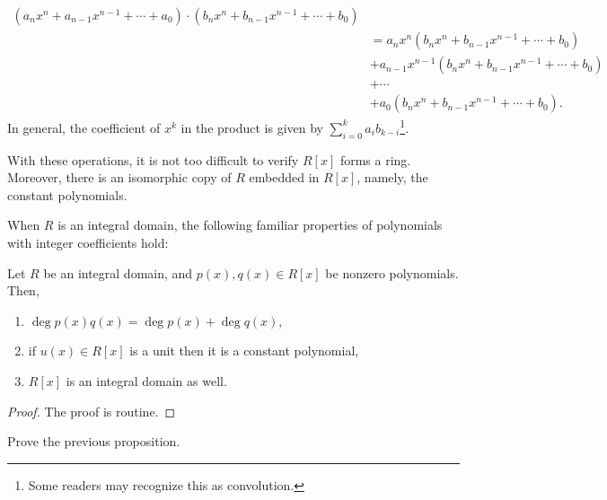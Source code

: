 \documentclass[./main.tex]{subfiles}
\begin{document}
\begin{align*}
    (a_n x^n + a_{n-1} x^{n-1} + \cdots + a_0) \cdot (b_n x^n + b_{n-1} x^{n-1} + \cdots + b_0) \\
    &= a_n x^n (b_n x^n + b_{n-1} x^{n-1} + \cdots + b_0) \\
    &+ a_{n-1} x^{n-1} (b_n x^n + b_{n-1} x^{n-1} + \cdots + b_0) \\
    &+ \cdots \\
    &+ a_0 (b_n x^n + b_{n-1} x^{n-1} + \cdots + b_0).
\end{align*}
In general, the coefficient of $x^k$ in the product is given by $\sum_{i=0}^k
a_i b_{k-i}$\footnote{Some readers may recognize this as convolution.}. 

With these operations, it is not too difficult to verify $R[x]$ forms a ring.
Moreover, there is an isomorphic copy of $R$ embedded in $R[x]$, namely, the
constant polynomials.

When $R$ is an integral domain, the following familiar properties of polynomials
with integer coefficients hold:
\begin{proposition}
    Let $R$ be an integral domain, and $p(x), q(x) \in R[x]$ be nonzero polynomials. Then, 
    \begin{enumerate}
        \item $\deg p(x) q(x) = \deg p(x) + \deg q(x)$,
        \item if $u(x) \in R[x]$ is a unit then it is a constant polynomial,
        \item $R[x]$ is an integral domain as well.
    \end{enumerate}
\end{proposition}
\begin{proof}
    The proof is routine.
\end{proof}

\begin{exercise}
    Prove the previous proposition.
\end{exercise}
\end{document}
